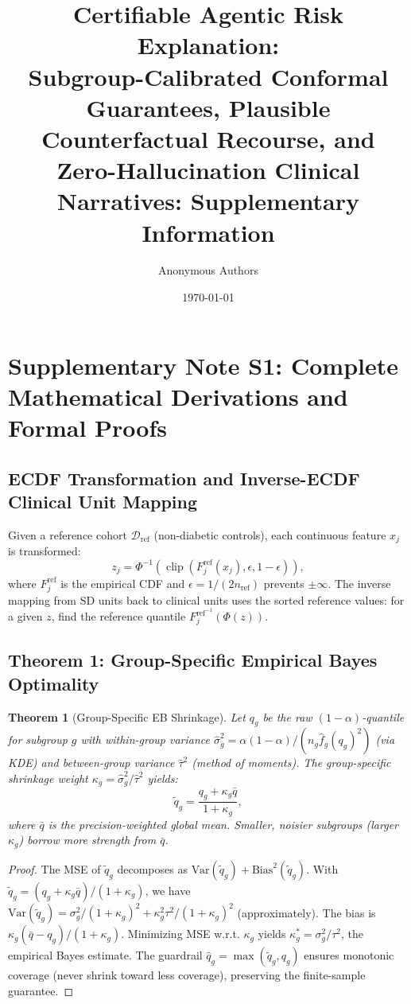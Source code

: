 \documentclass[11pt,a4paper]{article}
\title{Certifiable Agentic Risk Explanation:\\
Subgroup-Calibrated Conformal Guarantees, Plausible Counterfactual Recourse, and Zero-Hallucination Clinical Narratives: Supplementary Information}
\author{Anonymous Authors}
\date{\today}
\theoremstyle{plain}
\newtheorem{theorem}{Theorem}
\begin{document}
\maketitle

\tableofcontents

\section{Supplementary Note S1: Complete Mathematical Derivations and Formal Proofs}
\label{sec:proofs}

\subsection{ECDF Transformation and Inverse-ECDF Clinical Unit Mapping}

Given a reference cohort $\mathcal{D}_{\text{ref}}$ (non-diabetic controls), each continuous feature $x_j$ is transformed:
\begin{equation}
z_j = \Phi^{-1}(\operatorname{clip}(F_j^{\text{ref}}(x_j), \epsilon, 1-\epsilon)),
\end{equation}
where $F_j^{\text{ref}}$ is the empirical CDF and $\epsilon = 1/(2n_{\text{ref}})$ prevents $\pm\infty$. The inverse mapping from SD units back to clinical units uses the sorted reference values: for a given $z$, find the reference quantile $F_j^{\text{ref}^{-1}}(\Phi(z))$.

\subsection{Theorem 1: Group-Specific Empirical Bayes Optimality}

\begin{theorem}[Group-Specific EB Shrinkage]
Let $q_g$ be the raw $(1-\alpha)$-quantile for subgroup $g$ with within-group variance $\hat\sigma_g^2 = \alpha(1-\alpha)/(n_g \hat f_g(q_g)^2)$ (via KDE) and between-group variance $\hat\tau^2$ (method of moments). The group-specific shrinkage weight $\kappa_g = \hat\sigma_g^2/\hat\tau^2$ yields:
\begin{equation}
\tilde q_g = \frac{q_g + \kappa_g \bar q}{1+\kappa_g},
\end{equation}
where $\bar q$ is the precision-weighted global mean. Smaller, noisier subgroups (larger $\kappa_g$) borrow more strength from $\bar q$.
\end{theorem}

\begin{proof}
The MSE of $\tilde q_g$ decomposes as $\text{Var}(\tilde q_g) + \text{Bias}^2(\tilde q_g)$. With $\tilde q_g = (q_g + \kappa_g \bar q)/(1+\kappa_g)$, we have $\text{Var}(\tilde q_g) = \sigma_g^2/(1+\kappa_g)^2 + \kappa_g^2\tau^2/(1+\kappa_g)^2$ (approximately). The bias is $\kappa_g(\bar q - q_g)/(1+\kappa_g)$. Minimizing MSE w.r.t. $\kappa_g$ yields $\kappa_g^* = \sigma_g^2/\tau^2$, the empirical Bayes estimate. The guardrail $\hat q_g = \max(\tilde q_g, q_g)$ ensures monotonic coverage (never shrink toward less coverage), preserving the finite-sample guarantee.
\end{proof}
\end{document}
